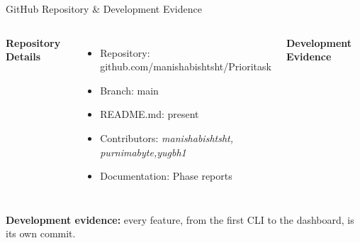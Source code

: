 \documentclass[aspectratio=169,11pt]{beamer}
\newcommand{\placeholder}[1]{%
\textit{\color{GEUGrey}#1}
}
\begin{document}
\begin{frame}{GitHub Repository \& Development Evidence}

\begin{columns}[T,totalwidth=\textwidth]


\textbf{\color{GEUBlue}Repository Details}

\begin{itemize}\itemsep3pt
    \item Repository:\\ {\footnotesize github.com/manishabishtsht/Prioritask}
    \item Branch: main
    \item README.md: present
    \item Contributors: \placeholder{manishabishtsht, purnimabyte,yugbh1}
    \item Documentation: Phase reports
\end{itemize}


\textbf{\color{GEUBlue}Development Evidence}


\end{columns}

\vfill

\begin{center}
\colorbox{GEULightBlue}{
\parbox{.88\textwidth}{
\centering
\textbf{Development evidence:}
every feature, from the first CLI to the dashboard, is its own commit.
}}
\end{center}

\end{frame}
\end{document}
